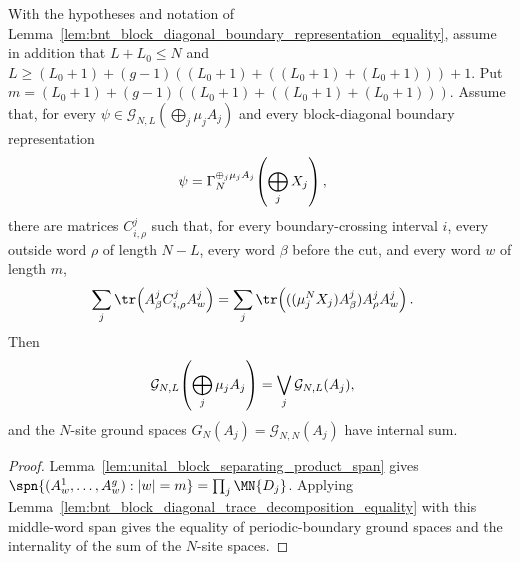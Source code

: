\begin{lemma}
    \label{lem:bnt_block_diagonal_trace_decomposition_bnt_span_equality}
    \leanok
    With the hypotheses and notation of
    Lemma~\ref{lem:bnt_block_diagonal_boundary_representation_equality}, assume
    in addition that $L+L_0\le N$ and
    $L \ge (L_0+1)+(g-1)((L_0+1)+((L_0+1)+(L_0+1)))+1$.
    Put
    $m = (L_0+1)+(g-1)((L_0+1)+((L_0+1)+(L_0+1)))$.
    Assume that, for every
    $\psi\in\mathcal G_{N,L}\!\left(\bigoplus_j\mu_jA_j\right)$
    and every block-diagonal boundary representation
    \begin{align}
        \psi
         & =
        \Gamma_N^{\oplus_j\mu_jA_j}\!\left(\bigoplus_jX_j\right),
        \notag
    \end{align}
    there are matrices $C^j_{i,\rho}$ such that, for every
    boundary-crossing interval $i$, every outside word $\rho$ of length $N-L$,
    every word $\beta$ before the cut, and every word $w$ of length $m$,
    \begin{align}
        \sum_j\tr\!\left(A^j_\beta C^j_{i,\rho}A^j_w\right)
         & =
        \sum_j
        \tr\!\left(((\mu_j^N X_j)A^j_\beta)A^j_\rho A^j_w\right).
        \notag
    \end{align}
    Then
    \begin{align}
        \mathcal G_{N,L}\!\left(\bigoplus_j\mu_jA_j\right)
         & =
        \bigvee_j\mathcal G_{N,L}(A_j),
        \notag
    \end{align}
    and the $N$-site ground spaces $G_N(A_j)=\mathcal G_{N,N}(A_j)$
    have internal sum.
\end{lemma}

\begin{proof}
    \leanok
    Lemma~\ref{lem:unital_block_separating_product_span} gives
    $\spn\{(A^1_w,\ldots,A^g_w):|w|=m\} = \prod_j\MN{D_j}$.
    Applying
    Lemma~\ref{lem:bnt_block_diagonal_trace_decomposition_equality} with this
    middle-word span gives the equality of periodic-boundary ground spaces and
    the internality of the sum of the $N$-site spaces.
\end{proof}

